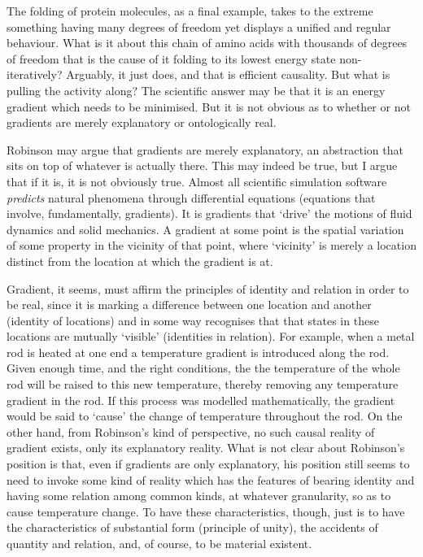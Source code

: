 The folding of protein molecules, as a final example, takes to the extreme something having many degrees of freedom yet displays a unified and regular behaviour. What is it about this chain of amino acids with thousands of degrees of freedom that is the cause of it folding to its lowest energy state non-iteratively? Arguably, it just does, and that is efficient causality. But what is pulling the activity along? The scientific answer may be that it is an energy gradient which needs to be minimised. But it is not obvious as to whether or not gradients are merely explanatory or ontologically real.

Robinson may argue that gradients are merely explanatory, an abstraction that sits on top of whatever is actually there. This may indeed be true, but I argue that if it is, it is not obviously true. Almost all scientific simulation software \emph{predicts} natural phenomena through differential equations (equations that involve, fundamentally, gradients). It is gradients that `drive' the motions of fluid dynamics and solid mechanics. A gradient at some point is the spatial variation of some property in the vicinity of that point, where `vicinity' is merely a location distinct from the location at which the gradient is at.

Gradient, it seems, must affirm the principles of identity and relation in order to be real, since it is marking a difference between one location and another (identity of locations) and in some way recognises that that states in these locations are mutually `visible' (identities in relation).
For example, when a metal rod is heated at one end a temperature gradient is introduced along the rod. Given enough time, and the right conditions, the the temperature of the whole rod will be raised to this new temperature, thereby removing any temperature gradient in the rod. If this process was modelled mathematically, the gradient would be said to `cause' the change of temperature throughout the rod. On the other hand, from Robinson's kind of perspective, no such causal reality of gradient exists, only its explanatory reality. What is not clear about Robinson's position is that, even if gradients are only explanatory, his position still seems to need to invoke some kind of reality which has the features of bearing identity and having some relation among common kinds, at whatever granularity, so as to cause temperature change. To have these characteristics, though, just is to have the characteristics of substantial form (principle of unity), the accidents of quantity and relation, and, of course, to be material existent.

